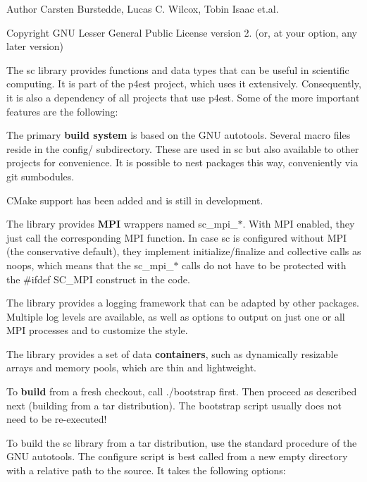 \begin{DoxyAuthor}{Author}
Carsten Burstedde, Lucas C. Wilcox, Tobin Isaac et.\+al. 
\end{DoxyAuthor}
\begin{DoxyCopyright}{Copyright}
GNU Lesser General Public License version 2. (or, at your option, any later version)
\end{DoxyCopyright}
The {\ttfamily sc} library provides functions and data types that can be useful in scientific computing. It is part of the {\ttfamily p4est} project, which uses it extensively. Consequently, it is also a dependency of all projects that use {\ttfamily p4est}. Some of the more important features are the following\+:


\begin{DoxyItemize}
\item The primary {\bfseries{build system}} is based on the GNU autotools. Several macro files reside in the config/ subdirectory. These are used in {\ttfamily sc} but also available to other projects for convenience. It is possible to nest packages this way, conveniently via git sumbodules.
\item CMake support has been added and is still in development.
\item The library provides {\bfseries{MPI}} wrappers named {\ttfamily sc\+\_\+mpi\+\_\+$\ast$}. With MPI enabled, they just call the corresponding MPI function. In case {\ttfamily sc} is configured without MPI (the conservative default), they implement initialize/finalize and collective calls as noops, which means that the {\ttfamily sc\+\_\+mpi\+\_\+$\ast$} calls do not have to be protected with the {\ttfamily \#ifdef SC\+\_\+\+MPI} construct in the code.
\item The library provides a logging framework that can be adapted by other packages. Multiple log levels are available, as well as options to output on just one or all MPI processes and to customize the style.
\item The library provides a set of data {\bfseries{containers}}, such as dynamically resizable arrays and memory pools, which are thin and lightweight.
\end{DoxyItemize}

To {\bfseries{build}} from a fresh checkout, call {\ttfamily ./bootstrap} first. Then proceed as described next (building from a tar distribution). The {\ttfamily bootstrap} script usually does not need to be re-\/executed!

To build the {\ttfamily sc} library from a tar distribution, use the standard procedure of the GNU autotools. The configure script is best called from a new empty directory with a relative path to the source. It takes the following options\+:


